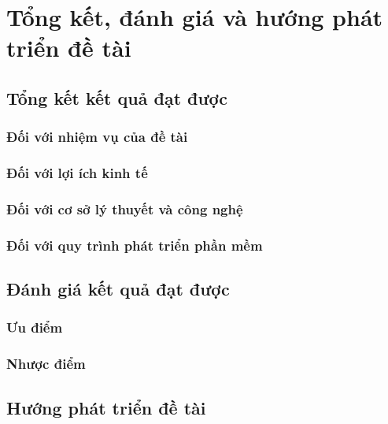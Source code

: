 \chapter{Tổng kết, đánh giá và hướng phát triển đề tài} \label{chapter:conclution}
\section{Tổng kết kết quả đạt được}
\subsection{Đối với nhiệm vụ của đề tài}


\subsection{Đối với lợi ích kinh tế}


\subsection{Đối với cơ sở lý thuyết và công nghệ}

\subsection{Đối với quy trình phát triển phần mềm}

\section{Đánh giá kết quả đạt được}
\subsection{Ưu điểm}

\subsection{Nhược điểm}


\section{Hướng phát triển đề tài}
